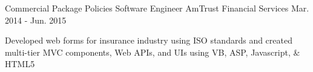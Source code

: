 \begin{cventries}
%
  \cventry
    {Commercial Package Policies} %
    {Software Engineer} %
    {AmTrust Financial Services} %
    {Mar. 2014 - Jun. 2015} %
    {
      \begin{cvparagraph}
        Developed web forms for insurance industry using ISO standards and created multi-tier MVC components, Web APIs, and UIs using VB, ASP, Javascript, \& HTML5
      \end{cvparagraph}
    }


\end{cventries}
